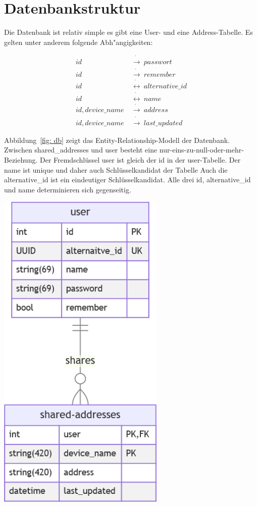 \section{Datenbankstruktur}\label{sec:datenbankstruktur}
Die Datenbank ist relativ simple es gibt eine User- und eine Address-Tabelle.
Es gelten unter anderem folgende Abh{"a}ngigkeiten:

\begin{align}
    id ~ &\dot \rightarrow ~ passwort \\
    id ~ &\dot \rightarrow ~ remember \\
    id ~ &\dot \leftrightarrow ~ alternative\_id \\
    id ~ &\dot \leftrightarrow ~ name \\
    id, device\_name ~ &\dot \rightarrow ~ address \\
    id, device\_name ~ &\dot \rightarrow ~ last\_updated
\end{align}

\begin{minipage}{0.425\textwidth}
    Abbildung~\ref{fig: db} zeigt das Entity-Relationship-Modell der Datenbank.
    Zwischen shared\_addresses und user besteht eine nur-eins-zu-null-oder-mehr-Beziehung.
    Der Fremdschlüssel user ist gleich der id in der user-Tabelle.
    Der name ist unique und daher auch Schlüsselkandidat der Tabelle
    Auch die alternative\_id ist ein eindeutiger Schlüsselkandidat.
    Alle drei id, alternative\_id und name determinieren sich gegenseitig.
\end{minipage}
\hspace{0.05\textwidth}
\begin{minipage}{0.425\textwidth}
    \centering
    \includegraphics[width=0.6\textwidth]{db}
    \label{fig: db}
\end{minipage}

